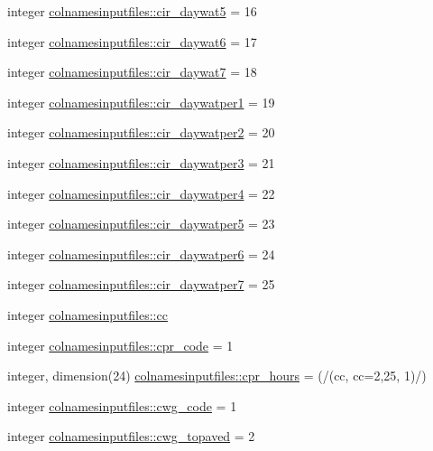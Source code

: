 \begin{DoxyCompactItemize}
integer \hyperlink{namespacecolnamesinputfiles_a7943b96a6ee53979d0394d5eefea95ed}{colnamesinputfiles\+::cir\+\_\+daywat5} = 16
\item 
integer \hyperlink{namespacecolnamesinputfiles_a1a09101de13db7f85453c989a9a891fc}{colnamesinputfiles\+::cir\+\_\+daywat6} = 17
\item 
integer \hyperlink{namespacecolnamesinputfiles_a8f31fe6755d7d8f089c4b244fd4b3115}{colnamesinputfiles\+::cir\+\_\+daywat7} = 18
\item 
integer \hyperlink{namespacecolnamesinputfiles_a3a96967e254f5137681427f9c99465eb}{colnamesinputfiles\+::cir\+\_\+daywatper1} = 19
\item 
integer \hyperlink{namespacecolnamesinputfiles_a80dbec2d6698a9ca1109bf06273aea49}{colnamesinputfiles\+::cir\+\_\+daywatper2} = 20
\item 
integer \hyperlink{namespacecolnamesinputfiles_aa686ddadbda26b6dd5198ef4f429e2ab}{colnamesinputfiles\+::cir\+\_\+daywatper3} = 21
\item 
integer \hyperlink{namespacecolnamesinputfiles_a7cc2b6bb7cb07b32eca0c822a6ff2d17}{colnamesinputfiles\+::cir\+\_\+daywatper4} = 22
\item 
integer \hyperlink{namespacecolnamesinputfiles_ac15044187066dced13198e564a45738d}{colnamesinputfiles\+::cir\+\_\+daywatper5} = 23
\item 
integer \hyperlink{namespacecolnamesinputfiles_acb2c6c0689b539ea0304aafc097df6b2}{colnamesinputfiles\+::cir\+\_\+daywatper6} = 24
\item 
integer \hyperlink{namespacecolnamesinputfiles_a99f8b756b8f4523b745b30592b1a9090}{colnamesinputfiles\+::cir\+\_\+daywatper7} = 25
\item 
integer \hyperlink{namespacecolnamesinputfiles_aee7fac5f3ecf99c110512bc11d4cd8a4}{colnamesinputfiles\+::cc}
\item 
integer \hyperlink{namespacecolnamesinputfiles_aa372231915b61eaf06a35e9f62426c61}{colnamesinputfiles\+::cpr\+\_\+code} = 1
\item 
integer, dimension(24) \hyperlink{namespacecolnamesinputfiles_a36cac26a00244cef8f0f55f3c6769bf0}{colnamesinputfiles\+::cpr\+\_\+hours} = (/(cc, cc=2,25, 1)/)
\item 
integer \hyperlink{namespacecolnamesinputfiles_a64bfff0bf57d14dd835e873f6f3167d8}{colnamesinputfiles\+::cwg\+\_\+code} = 1
\item 
integer \hyperlink{namespacecolnamesinputfiles_a2dd0d1d55401afccfbcce4af42d45dc6}{colnamesinputfiles\+::cwg\+\_\+topaved} = 2
\item 

\end{DoxyCompactItemize}
